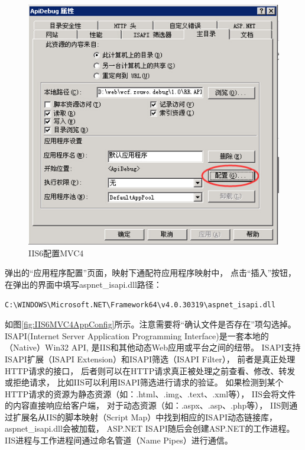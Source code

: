 \documentclass{book}
\begin{document}
\begin{figure}[htbp]
	\centering
	\includegraphics[scale=0.8]{IIS6MVC4ConfigAttribute.jpg}
	\caption{IIS6配置MVC4}
	\label{fig:IIS6MVC4ConfigAttribute}
\end{figure}

弹出的“应用程序配置”页面，映射下通配符应用程序映射中，
点击“插入”按钮，在弹出的界面中填写aspnet\_isapi.dll路径：

\begin{lstlisting}
C:\WINDOWS\Microsoft.NET\Framework64\v4.0.30319\aspnet_isapi.dll
\end{lstlisting}

如图\ref{fig:IIS6MVC4AppConfig}所示。注意需要将“确认文件是否存在”项勾选掉。
ISAPI(Internet Server Application Programming Interface)是一套本地的（Native）Win32 API,
是IIS和其他动态Web应用或平台之间的纽带。
ISAPI支持ISAPI扩展（ISAPI Extension）和ISAPI筛选（ISAPI Filter），
前者是真正处理HTTP请求的接口，
后者则可以在HTTP请求真正被处理之前查看、修改、转发或拒绝请求，
比如IIS可以利用ISAPI筛选进行请求的验证。
如果检测到某个HTTP请求的资源为静态资源（如：.html、.img、.text、.xml等），
IIS会将文件的内容直接响应给客户端，
对于动态资源（如：.aspx、.asp、.php等），
IIS则通过扩展名从IIS的脚本映射（Script Map）中找到相应的ISAPI动态链接库，
aspnet\_isapi.dll会被加载，
ASP.NET ISAPI随后会创建ASP.NET的工作进程。
IIS进程与工作进程间通过命名管道（Name Pipes）进行通信\cite{蒋金楠MVC框架揭秘}。
\end{document}
